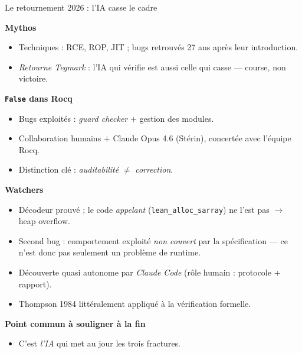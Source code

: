 \documentclass[aspectratio=169]{beamer}
\begin{document}
\begin{frame}{Le retournement 2026 : l'IA casse le cadre}
{    \textbf{Mythos}
    \begin{itemize}
      \item Techniques : RCE, ROP, JIT ; bugs retrouvés 27 ans après leur introduction.
      \item \emph{Retourne Tegmark} : l'IA qui vérifie est aussi celle qui casse --- course, non victoire.
    \end{itemize}
    \textbf{\texttt{False} dans Rocq}
    \begin{itemize}
      \item Bugs exploités : \emph{guard checker} + gestion des modules.
      \item Collaboration humains $+$ Claude Opus 4.6 (Stérin), concertée avec l'équipe Rocq.
      \item Distinction clé : \emph{auditabilité} $\neq$ \emph{correction}.
    \end{itemize}
    \textbf{Watchers}
    \begin{itemize}
      \item Décodeur prouvé ; le code \emph{appelant} (\texttt{lean\_alloc\_sarray}) ne l'est pas $\to$ heap overflow.
      \item Second bug : comportement exploité \emph{non couvert} par la spécification --- ce n'est donc pas seulement un problème de runtime.
      \item Découverte quasi autonome par \emph{Claude Code} (rôle humain : protocole + rapport).
      \item Thompson 1984 littéralement appliqué à la vérification formelle.
    \end{itemize}
    \textbf{Point commun à souligner à la fin}
    \begin{itemize}
      \item C'est \emph{l'IA} qui met au jour les trois fractures.
    \end{itemize}
  }
\end{frame}
\end{document}
